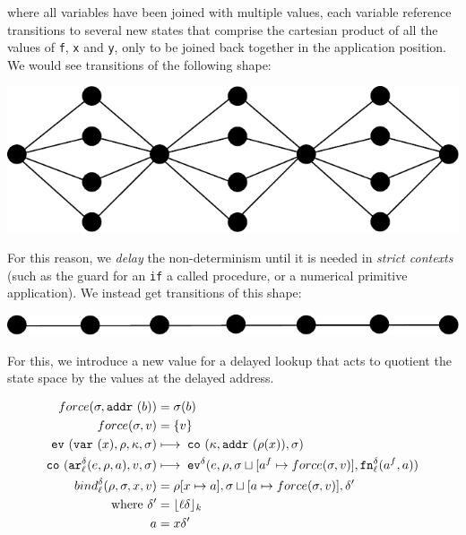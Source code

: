 \documentclass[preprint,onecolumn,9pt]{sigplanconf} %
\begin{document}
where all variables have been joined with multiple values, each
variable reference transitions to several new states that comprise the
cartesian product of all the values of {\tt f}, {\tt x} and {\tt y},
only to be joined back together in the application position. We would see transitions of the following shape:
\begin{center}
\includegraphics[scale=0.3]{fanout.pdf}
\end{center}
For this reason, we {\it delay} the non-determinism
until it is needed in {\it strict contexts} (such as the guard for an
{\tt if} a called procedure, or a numerical primitive application). We instead get transitions of this shape:
\begin{center}
\includegraphics[scale=0.3]{lazy.pdf}
\end{center}

For this, we introduce a new value for a delayed lookup that acts to
quotient the state space by the values at the delayed address.

\begin{align*}
force(\msto,\saddr\maddralt) &= \msto(\maddralt)\\
force(\msto,\mval) &= \{\mval\}\\
\ev{\svar{\mvar},\menv,\mkont,\msto} &\machstep\;
\co{\mkont,\saddr{\menv(\mvar)},\msto} \\
\co{\kar[^\mcntr_\mlab]{\mexp,\menv,\maddr},\mval,\msto}
&\machstep\;
\ev[^\mcntr]{\mexp,\menv,\msto\sqcup[\maddr^f \mapsto force(\msto,\mval)],\kfn[^\mcntr_\mlab]{\maddr^f,\maddr}} \\
bind^\mcntr_\mlab(\menv,\msto,\mvar,\mval) &= \menv[\mvar \mapsto
  \maddr], \msto\sqcup[\maddr \mapsto force(\msto, \mval)], \mcntr' \\
\mbox{where } \mcntr' &= \lfloor\mlab\mcntr\rfloor_k \\
              \maddr &= \mvar\mcntr'
\end{align*}
\end{document}
